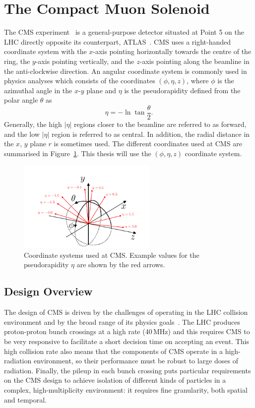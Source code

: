 \section{The Compact Muon Solenoid}

The CMS experiment~\cite{CMSatLHC} is a general-purpose detector situated at Point 5 on the LHC directly opposite its counterpart, ATLAS~\cite{AtlasatLHC}. CMS uses a right-handed coordinate system with the $x$-axis pointing horizontally towards the centre of the ring, the $y$-axis pointing vertically, and the $z$-axis pointing along the beamline in the anti-clockwise direction. 
An angular coordinate system is commonly used in physics analyses which consists of the coordinates $(\phi,\eta,z)$, where $\phi$ is the azimuthal angle in the $x$-$y$ plane and $\eta$ is the pseudorapidity defined from the polar angle $\theta$ as
\begin{equation}
    \label{eq:apparatus:pseudorapidity}
    \eta = -\ln\tan{\frac{\theta}{2}}.
\end{equation}
Generally, the high $|\eta|$ regions closer to the beamline are referred to as forward, and the low $|\eta|$ region is referred to as central. 
In addition, the radial distance in the $x$, $y$ plane $r$ is sometimes used. The different coordinates used at CMS are summarised in Figure~\ref{fig:apparatus:coords}. This thesis will use the $(\phi,\eta,z)$ coordinate system. 
\begin{figure}[h!]
    \centering
    \includegraphics[width=0.6\textwidth]{figures/apparatus/CMS_coords.pdf}
    \caption{Coordinate systems used at CMS. Example values for the pseudorapidity $\eta$ are shown by the red arrows.}
    \label{fig:apparatus:coords}
\end{figure}

\subsection{Design Overview}
The design of CMS is driven by the challenges of operating in the LHC collision environment and by the broad range of its physics goals~\cite{CMSPhysics}.
The LHC produces proton-proton bunch crossings at a high rate (40\,MHz) and this requires CMS to be very responsive to facilitate a short decision time on accepting an event. This high collision rate also means that the components of CMS operate in a high-radiation environment, so their performance must be robust to large doses of radiation. Finally, the pileup in each bunch crossing puts particular requirements on the CMS design to achieve isolation of different kinds of particles in a complex, high-multiplicity environment: it requires fine granularity, both spatial and temporal. 


